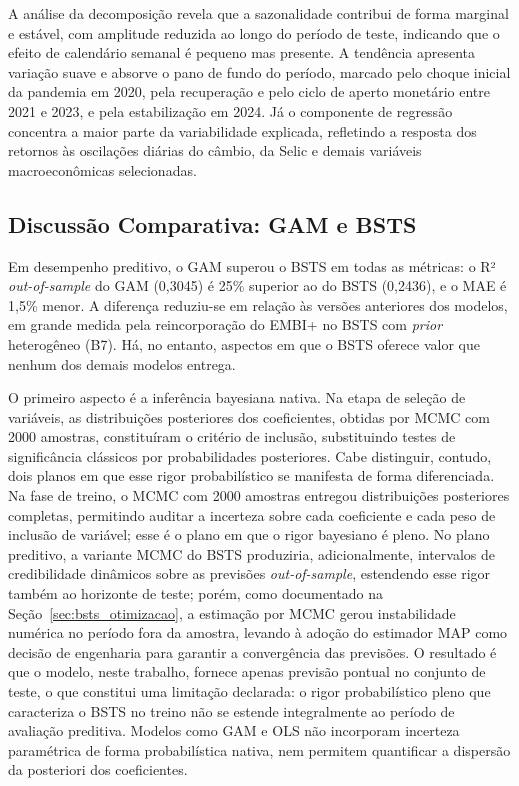 \documentclass[	12pt, Times, openright, oneside, a4paper, english, brazil]{abntex2}
\begin{document}
A análise da decomposição revela que a sazonalidade contribui de forma marginal e estável, com amplitude reduzida ao longo do período de teste, indicando que o efeito de calendário semanal é pequeno mas presente. A tendência apresenta variação suave e absorve o pano de fundo do período, marcado pelo choque inicial da pandemia em 2020, pela recuperação e pelo ciclo de aperto monetário entre 2021 e 2023, e pela estabilização em 2024. Já o componente de regressão concentra a maior parte da variabilidade explicada, refletindo a resposta dos retornos às oscilações diárias do câmbio, da Selic e demais variáveis macroeconômicas selecionadas.

\subsection{Discussão Comparativa: GAM e BSTS}

Em desempenho preditivo, o GAM superou o BSTS em todas as métricas: o R² \textit{out-of-sample} do GAM (0{,}3045) é 25\% superior ao do BSTS (0{,}2436), e o MAE é 1{,}5\% menor. A diferença reduziu-se em relação às versões anteriores dos modelos, em grande medida pela reincorporação do EMBI+ no BSTS com \textit{prior} heterogêneo (B7). Há, no entanto, aspectos em que o BSTS oferece valor que nenhum dos demais modelos entrega.

O primeiro aspecto é a inferência bayesiana nativa. Na etapa de seleção de variáveis, as distribuições posteriores dos coeficientes, obtidas por MCMC com 2000 amostras, constituíram o critério de inclusão, substituindo testes de significância clássicos por probabilidades posteriores. Cabe distinguir, contudo, dois planos em que esse rigor probabilístico se manifesta de forma diferenciada. Na fase de treino, o MCMC com 2000 amostras entregou distribuições posteriores completas, permitindo auditar a incerteza sobre cada coeficiente e cada peso de inclusão de variável; esse é o plano em que o rigor bayesiano é pleno. No plano preditivo, a variante MCMC do BSTS produziria, adicionalmente, intervalos de credibilidade dinâmicos sobre as previsões \textit{out-of-sample}, estendendo esse rigor também ao horizonte de teste; porém, como documentado na Seção~\ref{sec:bsts_otimizacao}, a estimação por MCMC gerou instabilidade numérica no período fora da amostra, levando à adoção do estimador MAP como decisão de engenharia para garantir a convergência das previsões. O resultado é que o modelo, neste trabalho, fornece apenas previsão pontual no conjunto de teste, o que constitui uma limitação declarada: o rigor probabilístico pleno que caracteriza o BSTS no treino não se estende integralmente ao período de avaliação preditiva. Modelos como GAM e OLS não incorporam incerteza paramétrica de forma probabilística nativa, nem permitem quantificar a dispersão da posteriori dos coeficientes.
\end{document}
